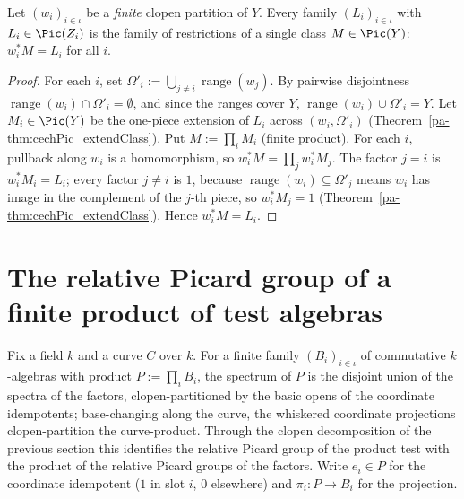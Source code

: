 \begin{theorem}
  \label{pa-thm:cechPic_clopen_gluing}
  \leanok

  Let \((w_i)_{i \in \iota}\) be a \emph{finite} clopen partition of \(Y\). Every family
  \((L_i)_{i \in \iota}\) with \(L_i \in \Pic(Z_i)\) is the family of restrictions of a single
  class \(M \in \Pic(Y)\): \(w_i^{*} M = L_i\) for all \(i\).
\end{theorem}
\begin{proof}
  \leanok
  For each \(i\), set \(\Omega'_i := \bigcup_{j \ne i} \operatorname{range}(w_j)\). By pairwise
  disjointness \(\operatorname{range}(w_i) \cap \Omega'_i = \emptyset\), and since the ranges cover
  \(Y\), \(\operatorname{range}(w_i) \cup \Omega'_i = Y\). Let \(M_i \in \Pic(Y)\) be the one-piece
  extension of \(L_i\) across \((w_i, \Omega'_i)\) (Theorem~\ref{pa-thm:cechPic_extendClass}). Put
  \(M := \prod_{i} M_i\) (finite product). For each \(i\), pullback along \(w_i\) is a homomorphism,
  so \(w_i^{*} M = \prod_j w_i^{*} M_j\). The factor \(j = i\) is \(w_i^{*} M_i = L_i\); every factor
  \(j \ne i\) is \(1\), because \(\operatorname{range}(w_i) \subseteq \Omega'_j\) means \(w_i\) has
  image in the complement of the \(j\)-th piece, so \(w_i^{*}M_j = 1\)
  (Theorem~\ref{pa-thm:cechPic_extendClass}). Hence \(w_i^{*} M = L_i\).
\end{proof}

\section{The relative Picard group of a finite product of test algebras}

Fix a field \(k\) and a curve \(C\) over \(k\). For a finite family \((B_i)_{i \in \iota}\) of
commutative \(k\)-algebras with product \(P := \prod_i B_i\), the spectrum of \(P\) is the disjoint
union of the spectra of the factors, clopen-partitioned by the basic opens of the coordinate
idempotents; base-changing along the curve, the whiskered coordinate projections clopen-partition
the curve-product. Through the clopen decomposition of the previous section this identifies the
relative Picard group of the product test with the product of the relative Picard groups of the
factors. Write \(e_i \in P\) for the coordinate idempotent (\(1\) in slot \(i\), \(0\) elsewhere)
and \(\pi_i \colon P \to B_i\) for the projection.

